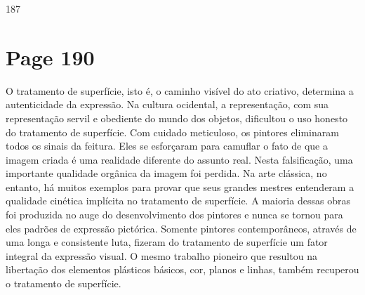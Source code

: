 \documentclass[a4paper]{article}
\begin{document}
\vfill %

\noindent\hfill 187

\newpage
\section*{Page 190}

O tratamento de superfície, isto é, o caminho visível do ato criativo, determina a autenticidade da expressão. Na cultura ocidental, a representação, com sua representação servil e obediente do mundo dos objetos, dificultou o uso honesto do tratamento de superfície. Com cuidado meticuloso, os pintores eliminaram todos os sinais da feitura. Eles se esforçaram para camuflar o fato de que a imagem criada é uma realidade diferente do assunto real. Nesta falsificação, uma importante qualidade orgânica da imagem foi perdida. Na arte clássica, no entanto, há muitos exemplos para provar que seus grandes mestres entenderam a qualidade cinética implícita no tratamento de superfície. A maioria dessas obras foi produzida no auge do desenvolvimento dos pintores e nunca se tornou para eles padrões de expressão pictórica. Somente pintores contemporâneos, através de uma longa e consistente luta, fizeram do tratamento de superfície um fator integral da expressão visual. O mesmo trabalho pioneiro que resultou na libertação dos elementos plásticos básicos, cor, planos e linhas, também recuperou o tratamento de superfície.
\end{document}
